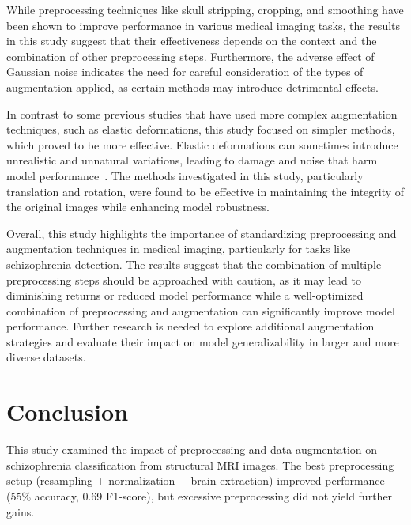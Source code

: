 While preprocessing techniques like skull stripping, cropping, and smoothing have been shown to improve performance in various medical imaging tasks, the results in this study suggest that their effectiveness depends on the context and the combination of other preprocessing steps. Furthermore, the adverse effect of Gaussian noise indicates the need for careful consideration of the types of augmentation applied, as certain methods may introduce detrimental effects.

In contrast to some previous studies that have used more complex augmentation techniques, such as elastic deformations, this study focused on simpler methods, which proved to be more effective. Elastic deformations can sometimes introduce unrealistic and unnatural variations, leading to damage and noise that harm model performance~\cite{Mok2018}. The methods investigated in this study, particularly translation and rotation, were found to be effective in maintaining the integrity of the original images while enhancing model robustness.

Overall, this study highlights the importance of standardizing preprocessing and augmentation techniques in medical imaging, particularly for tasks like schizophrenia detection. The results suggest that the combination of multiple preprocessing steps should be approached with caution, as it may lead to diminishing returns or reduced model performance while a well-optimized combination of preprocessing and augmentation can significantly improve model performance. Further research is needed to explore additional augmentation strategies and evaluate their impact on model generalizability in larger and more diverse datasets.





\section{Conclusion}

This study examined the impact of preprocessing and data augmentation on schizophrenia classification from structural MRI images. The best preprocessing setup (resampling + normalization + brain extraction) improved performance (55\% accuracy, 0.69 F1-score), but excessive preprocessing did not yield further gains.

